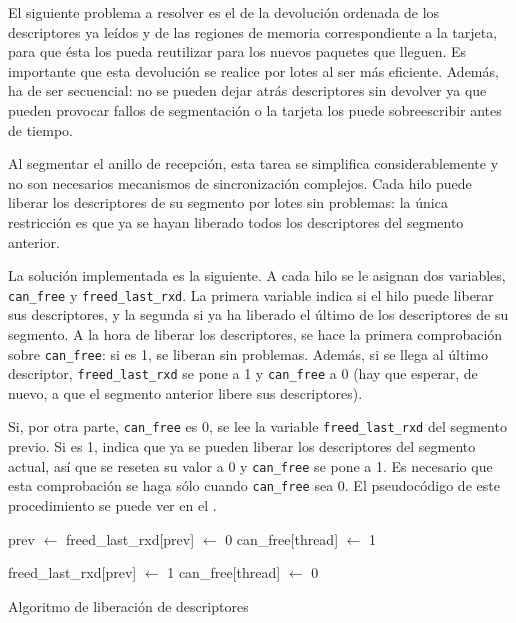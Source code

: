 \documentclass[oneside, draft]{epstfg}
\begin{document}
El siguiente problema a resolver es el de la devolución ordenada de los descriptores ya leídos y de las regiones de memoria correspondiente a la tarjeta, para que ésta los pueda reutilizar para los nuevos paquetes que lleguen. Es importante que esta devolución se realice por lotes al ser más eficiente. Además, ha de ser secuencial: no se pueden dejar atrás descriptores sin devolver ya que pueden provocar fallos de segmentación o la tarjeta los puede sobreescribir antes de tiempo.

Al segmentar el anillo de recepción, esta tarea se simplifica considerablemente y no son necesarios mecanismos de sincronización complejos. Cada hilo puede liberar los descriptores de su segmento por lotes sin problemas: la única restricción es que ya se hayan liberado todos los descriptores del segmento anterior.

La solución implementada es la siguiente. A cada hilo se le asignan dos variables, \texttt{can\_free} y \texttt{freed\_last\_rxd}. La primera variable indica si el hilo puede liberar sus descriptores, y la segunda si ya ha liberado el último de los descriptores de su segmento. A la hora de liberar los descriptores, se hace la primera comprobación sobre \texttt{can\_free}: si es 1, se liberan sin problemas. Además, si se llega al último descriptor, \texttt{freed\_last\_rxd} se pone a 1 y \texttt{can\_free} a 0 (hay que esperar, de nuevo, a que el segmento anterior libere sus descriptores).

Si, por otra parte, \texttt{can\_free} es 0, se lee la variable \texttt{freed\_last\_rxd} del segmento previo. Si es 1, indica que ya se pueden liberar los descriptores del segmento actual, así que se resetea su valor a 0 y \texttt{can\_free} se pone a 1. Es necesario que esta comprobación se haga sólo cuando \texttt{can\_free} sea 0. El pseudocódigo de este procedimiento se puede ver en el .

\begin{algorithm}[hbtp]
\begin{algorithmic}
\State prev $\gets$ 
		\State freed\_last\_rxd[prev] $\gets$ 0
		\State can\_free[thread] $\gets$ 1
		\State {}
	\EndIf

		\State {}

			\State {}
			\State freed\_last\_rxd[prev] $\gets$ 1
			\State can\_free[thread] $\gets$ 0
		\EndIf
	\EndIf
\EndFunction
\end{algorithmic}
\caption{Algoritmo de liberación de descriptores}
\label{lst:AlgoritmoDescriptores}
\end{algorithm}
\end{document}

